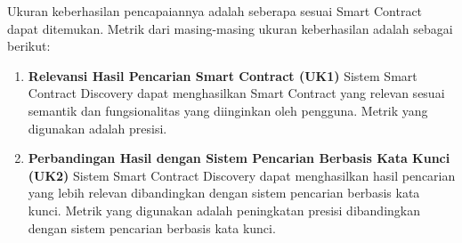 
Ukuran keberhasilan pencapaiannya adalah seberapa sesuai Smart Contract dapat ditemukan. Metrik dari masing-masing ukuran keberhasilan adalah sebagai berikut:

\begin{enumerate}
	\item \textbf{Relevansi Hasil Pencarian Smart Contract (UK1)} \newline
	      Sistem Smart Contract Discovery dapat menghasilkan Smart Contract yang relevan sesuai semantik dan fungsionalitas yang diinginkan oleh pengguna. Metrik yang digunakan adalah presisi.

	\item \textbf{Perbandingan Hasil dengan Sistem Pencarian Berbasis Kata Kunci (UK2)} \newline
	      Sistem Smart Contract Discovery dapat menghasilkan hasil pencarian yang lebih relevan dibandingkan dengan sistem pencarian berbasis kata kunci. Metrik yang digunakan adalah peningkatan presisi dibandingkan dengan sistem pencarian berbasis kata kunci.
\end{enumerate}